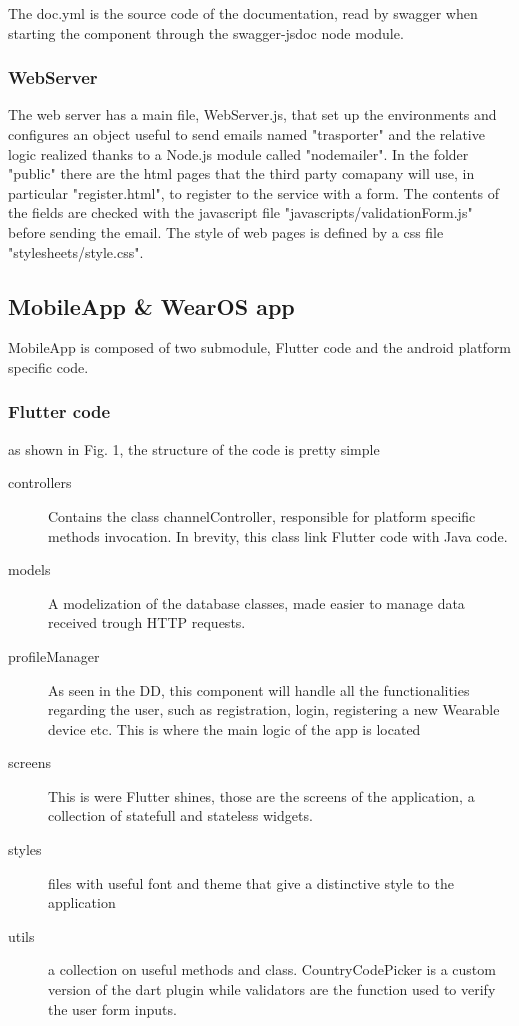 \documentclass[../main.tex]{subfiles}
\begin{document}
The doc.yml is the source code of the documentation, read by swagger when starting the component through the swagger-jsdoc node module.

\subsubsection{WebServer}

The web server has a main file, WebServer.js, that set up the environments and configures an object useful to send emails named "trasporter" and the relative logic realized thanks to a Node.js module called "nodemailer".
In the folder "public" there are the html pages that the third party comapany will use, in particular "register.html", to register to the service with a form. The contents of the fields are checked with the javascript file "javascripts/validationForm.js" before sending the email.
The style of web pages is defined by a css file "stylesheets/style.css".

\subsection{MobileApp \& WearOS app}
MobileApp is composed of two submodule, Flutter code and the android platform specific code.

\subsubsection{Flutter code}
as shown in Fig. 1, the structure of the code is pretty simple
\begin{description}
	\item[controllers] Contains the class channelController, responsible for platform specific methods invocation. In brevity, this class link Flutter code with Java code.
	\item[models] A modelization of the database classes, made easier to manage data received trough HTTP requests.
	\item[profileManager] As seen in the DD, this component will handle all the functionalities regarding the user, such as registration, login, registering a new Wearable device etc. This is where the main logic of the app is located
	\item[screens] This is were Flutter shines, those are the screens of the application, a collection of statefull and stateless widgets.
	\item[styles] files with useful font and theme that give a distinctive style to the application
	\item[utils] a collection on useful methods and class. CountryCodePicker is a custom version of the dart plugin while validators are the function used to verify the user form inputs.
\end{description}
\end{document}
